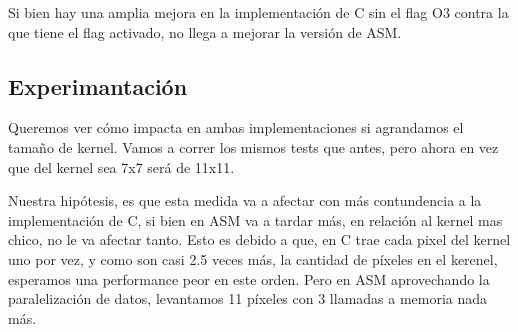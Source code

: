 Si bien hay una amplia mejora en la implementación de C sin el flag O3 contra la que tiene el flag activado, no llega a mejorar la versión de ASM. 

\subsection{Experimantación}
Queremos ver cómo impacta en ambas implementaciones si agrandamos el tamaño de kernel. Vamos a correr los mismos tests que antes, pero ahora en vez que del kernel sea 7x7 será de 11x11.

Nuestra hipótesis, es que esta medida va a afectar con más contundencia a la implementación de C, si bien en ASM va a tardar más, en relación al kernel mas chico, no le va afectar tanto. Esto es debido a que, en C trae cada pixel del kernel uno por vez, y como son casi 2.5 veces más, la cantidad de píxeles en el kerenel, esperamos una performance peor en este orden. Pero en ASM aprovechando la paralelización de datos, levantamos 11 píxeles con 3 llamadas a memoria nada más.


